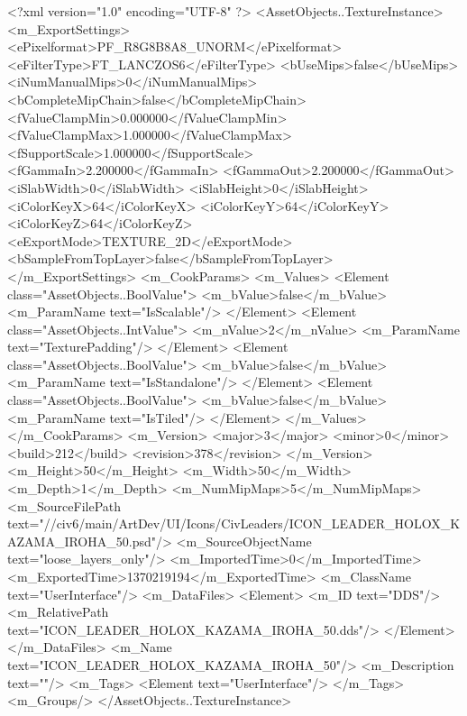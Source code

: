 <?xml version="1.0" encoding="UTF-8" ?>
<AssetObjects..TextureInstance>
	<m_ExportSettings>
		<ePixelformat>PF_R8G8B8A8_UNORM</ePixelformat>
		<eFilterType>FT_LANCZOS6</eFilterType>
		<bUseMips>false</bUseMips>
		<iNumManualMips>0</iNumManualMips>
		<bCompleteMipChain>false</bCompleteMipChain>
		<fValueClampMin>0.000000</fValueClampMin>
		<fValueClampMax>1.000000</fValueClampMax>
		<fSupportScale>1.000000</fSupportScale>
		<fGammaIn>2.200000</fGammaIn>
		<fGammaOut>2.200000</fGammaOut>
		<iSlabWidth>0</iSlabWidth>
		<iSlabHeight>0</iSlabHeight>
		<iColorKeyX>64</iColorKeyX>
		<iColorKeyY>64</iColorKeyY>
		<iColorKeyZ>64</iColorKeyZ>
		<eExportMode>TEXTURE_2D</eExportMode>
		<bSampleFromTopLayer>false</bSampleFromTopLayer>
	</m_ExportSettings>
	<m_CookParams>
		<m_Values>
			<Element class="AssetObjects..BoolValue">
				<m_bValue>false</m_bValue>
				<m_ParamName text="IsScalable"/>
			</Element>
			<Element class="AssetObjects..IntValue">
				<m_nValue>2</m_nValue>
				<m_ParamName text="TexturePadding"/>
			</Element>
			<Element class="AssetObjects..BoolValue">
				<m_bValue>false</m_bValue>
				<m_ParamName text="IsStandalone"/>
			</Element>
			<Element class="AssetObjects..BoolValue">
				<m_bValue>false</m_bValue>
				<m_ParamName text="IsTiled"/>
			</Element>
		</m_Values>
	</m_CookParams>
	<m_Version>
		<major>3</major>
		<minor>0</minor>
		<build>212</build>
		<revision>378</revision>
	</m_Version>
	<m_Height>50</m_Height>
	<m_Width>50</m_Width>
	<m_Depth>1</m_Depth>
	<m_NumMipMaps>5</m_NumMipMaps>
	<m_SourceFilePath text="//civ6/main/ArtDev/UI/Icons/CivLeaders/ICON_LEADER_HOLOX_KAZAMA_IROHA_50.psd"/>
	<m_SourceObjectName text="loose_layers_only"/>
	<m_ImportedTime>0</m_ImportedTime>
	<m_ExportedTime>1370219194</m_ExportedTime>
	<m_ClassName text="UserInterface"/>
	<m_DataFiles>
		<Element>
			<m_ID text="DDS"/>
			<m_RelativePath text="ICON_LEADER_HOLOX_KAZAMA_IROHA_50.dds"/>
		</Element>
	</m_DataFiles>
	<m_Name text="ICON_LEADER_HOLOX_KAZAMA_IROHA_50"/>
	<m_Description text=""/>
	<m_Tags>
		<Element text="UserInterface"/>
	</m_Tags>
	<m_Groups/>
</AssetObjects..TextureInstance>


